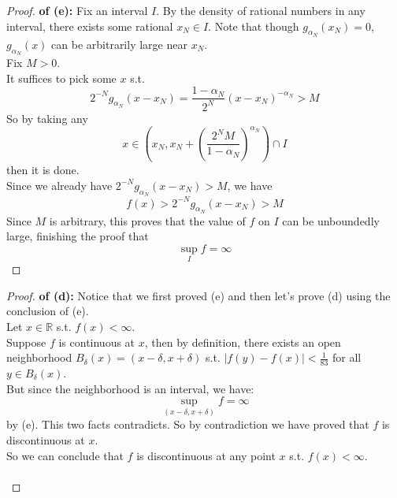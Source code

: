 \documentclass[lang=cn,11pt]{elegantbook}
\begin{document}
\begin{proof}
\textbf{of (e):}
Fix an interval \( I \). By the density of rational numbers in any interval, there exists some rational $x_N \in I$. Note that though $g_{\alpha_N} (x_N) = 0$, $g_{\alpha_N} (x)$ can be arbitrarily large near $x_N$.\\
Fix $M > 0$.\\
It suffices to pick some $x$ s.t.
\[
2^{-N}g_{\alpha_N } (x-x_N) = \frac{1-\alpha_N}{2^N}   (x-x_N)^{-\alpha_N} > M
\]
So by taking any\[
x \in (x_N, x_N + (\frac{2^N M}{1-\alpha_N})^{\alpha_N}) \cap I
\]
then it is done.\\
Since we already have $2^{-N}g_{\alpha_N } (x-x_N) > M$, we have \[
f(x) > 2^{-N}g_{\alpha_N } (x-x_N) > M
\]
Since $M$ is arbitrary, this proves that the value of $f$ on $I$ can be unboundedly large, finishing the proof that \[
\sup_I f = \infty
\]
\end{proof}


\begin{proof}
\textbf{of (d):}
Notice that we first proved (e) and then let's prove (d) using the conclusion of (e).\\
Let $x \in \mathbb{R}$ s.t. \(f(x)<\infty\).\\
Suppose $f$ is continuous at $x$, then by definition, there exists an open neighborhood $B_\delta(x) = (x-\delta, x+ \delta)$ s.t. $|f(y) - f(x)| < \frac{1}{83}$ for all $y \in B_\delta (x)$.\\
But since the neighborhood is an interval, we have:\[
\sup_{(x-\delta, x+ \delta)} f = \infty
\] by (e). This two facts contradicts. So by contradiction we have proved that $f$ is discontinuous at $x$.\\
So we can conclude that $f$ is discontinuous at any point $x$ s.t. $f(x) < \infty$.\\\\
\end{proof}
\end{document}

